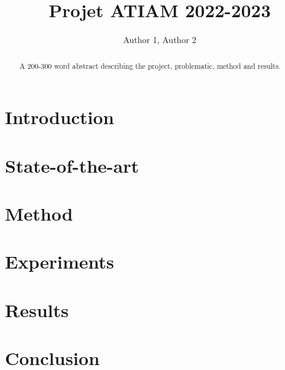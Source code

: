 \documentclass{article}
\title{Projet ATIAM 2022-2023}
\author{Author 1, Author 2}
\begin{document}
\maketitle

\begin{abstract}
    A 200-300 word abstract describing the project, problematic, method and results.
\end{abstract}

\section{Introduction}

\section{State-of-the-art}

\section{Method}

\section{Experiments}

\section{Results}

\section{Conclusion}
\end{document}
